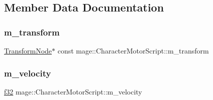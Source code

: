 \subsection{Member Data Documentation}
\hypertarget{classmage_1_1_character_motor_script_ab73049127363ded0e6e8fb474b51794e}{}\label{classmage_1_1_character_motor_script_ab73049127363ded0e6e8fb474b51794e} 
\subsubsection{\texorpdfstring{m\+\_\+transform}{m\_transform}}
{\footnotesize\ttfamily \hyperlink{structmage_1_1_transform_node}{Transform\+Node}$\ast$ const mage\+::\+Character\+Motor\+Script\+::m\+\_\+transform\hspace{0.3cm}{\ttfamily [private]}}

\hypertarget{classmage_1_1_character_motor_script_a6ac864bc9681277223fda733e3243f53}{}\label{classmage_1_1_character_motor_script_a6ac864bc9681277223fda733e3243f53} 
\subsubsection{\texorpdfstring{m\+\_\+velocity}{m\_velocity}}
{\footnotesize\ttfamily \hyperlink{namespacemage_a6a44ad388483959dc4dff9f2aef91431}{f32} mage\+::\+Character\+Motor\+Script\+::m\+\_\+velocity\hspace{0.3cm}{\ttfamily [private]}}

